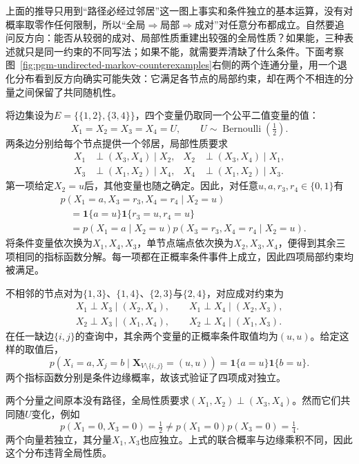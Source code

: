 上面的推导只用到“路径必经过邻居”这一图上事实和条件独立的基本运算，没有对概率取零作任何限制，所以“全局$\Rightarrow$局部$\Rightarrow$成对”对任意分布都成立。自然要追问反方向：能否从较弱的成对、局部性质重建出较强的全局性质？如果能，三种表述就只是同一约束的不同写法；如果不能，就需要弄清缺了什么条件。下面考察图~\ref{fig:pgm-undirected-markov-counterexamples}右侧的两个连通分量，用一个退化分布看到反方向确实可能失效：它满足各节点的局部约束，却在两个不相连的分量之间保留了共同随机性。

\begin{example}[局部、成对均不蕴含全局]
  \label{ex:pgm-undirected-local-not-global}
  将边集设为$E=\{\{1,2\},\{3,4\}\}$，四个变量仍取同一个公平二值变量的值：
  \[
    X_1=X_2=X_3=X_4=U,
    \qquad U\sim\operatorname{Bernoulli}(\tfrac12).
  \]
  两条边分别给每个节点提供一个邻居，局部性质要求
  \[
  \begin{aligned}
    X_1&\perp(X_3,X_4)\mid X_2,&
    X_2&\perp(X_3,X_4)\mid X_1,\\
    X_3&\perp(X_1,X_2)\mid X_4,&
    X_4&\perp(X_1,X_2)\mid X_3.
  \end{aligned}
  \]
  第一项给定$X_2=u$后，其他变量也随之确定。因此，对任意$u,a,r_3,r_4\in\{0,1\}$有
  \[
  \begin{aligned}
    &p(X_1=a,X_3=r_3,X_4=r_4\mid X_2=u)\\
    &\quad=\mathbf{1}\{a=u\}
            \mathbf{1}\{r_3=u,r_4=u\}\\
    &\quad=p(X_1=a\mid X_2=u)
            p(X_3=r_3,X_4=r_4\mid X_2=u).
  \end{aligned}
  \]
  将条件变量依次换为$X_1,X_4,X_3$，单节点端点依次换为$X_2,X_3,X_4$，便得到其余三项相同的指标函数分解。每一项都在正概率条件事件上成立，因此四项局部约束均被满足。

  不相邻的节点对为$\{1,3\}$、$\{1,4\}$、$\{2,3\}$与$\{2,4\}$，对应成对约束为
  \[
  \begin{gathered}
    X_1\perp X_3\mid(X_2,X_4),\qquad
    X_1\perp X_4\mid(X_2,X_3),\\
    X_2\perp X_3\mid(X_1,X_4),\qquad
    X_2\perp X_4\mid(X_1,X_3).
  \end{gathered}
  \]
  在任一缺边$\{i,j\}$的查询中，其余两个变量的正概率条件取值均为$(u,u)$。给定这样的取值后，
  \[
    p(X_i=a,X_j=b\mid\bm{X}_{V\setminus\{i,j\}}=(u,u))
    =\mathbf{1}\{a=u\}\mathbf{1}\{b=u\}.
  \]
  两个指标函数分别是条件边缘概率，故该式验证了四项成对独立。

  两个分量之间原本没有路径，全局性质要求$(X_1,X_2)\perp(X_3,X_4)$。然而它们共同随$U$变化，例如
  \[
    p(X_1=0,X_3=0)=\tfrac12
    \neq p(X_1=0)p(X_3=0)=\tfrac14.
  \]
  两个向量若独立，其分量$X_1,X_3$也应独立。上式的联合概率与边缘乘积不同，因此这个分布违背全局性质。
\end{example}

